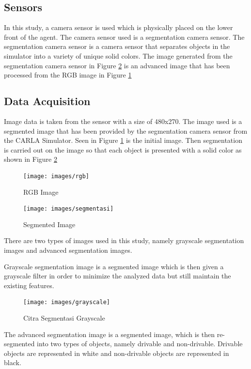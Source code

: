 \documentclass[conference]{IEEEtran}
\begin{document}
\subsection{Sensors}
\label{sec:sensor}
In this study, a camera sensor is used which is physically placed on the lower front of the agent. The camera sensor used is a segmentation camera sensor. The segmentation camera sensor is a camera sensor that separates objects in the simulator into a variety of unique solid colors. The image generated from the segmentation camera sensor in Figure  \ref{fig:segmentasi} is an advanced image that has been processed from the RGB image in Figure \ref{fig:citra_rgb}


\subsection{Data Acquisition}
\label{sec:akuisisi_data}
Image data is taken from the sensor with a size of 480x270. The image used is a segmented image that has been provided by the segmentation camera sensor from the CARLA Simulator. Seen in Figure \ref{fig:citra_rgb} is the initial image. Then segmentation is carried out on the image so that each object is presented with a solid color as shown in Figure \ref{fig:segmentasi}

\begin{figure}[H] 
	\centering
	\texttt{[image: images/rgb]}
	\caption{RGB Image}
	\label{fig:citra_rgb}
\end{figure}
\begin{figure}[H] 
	\centering
	\texttt{[image: images/segmentasi]}
	\caption{Segmented Image}
	\label{fig:segmentasi}
\end{figure}
There are two types of images used in this study, namely grayscale segmentation images and advanced segmentation images.

Grayscale segmentation image is a segmented image which is then given a grayscale filter in order to minimize the analyzed data but still maintain the existing features.	

\begin{figure}[H] 
	\centering
	\texttt{[image: images/grayscale]}
	\caption{Citra Segmentasi Grayscale}
	\label{fig:grayscale}
\end{figure}

The advanced segmentation image is a segmented image, which is then re-segmented into two types of objects, namely drivable and non-drivable. Drivable objects are represented in white and non-drivable objects are represented in black.
\end{document}
